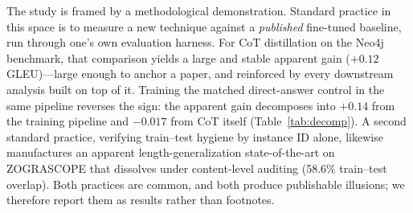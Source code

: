 \documentclass[11pt]{article}
\begin{document}
The study is framed by a methodological demonstration. Standard practice in this space is to
measure a new technique against a \emph{published} fine-tuned baseline, run through one's own
evaluation harness. For CoT distillation on the Neo4j benchmark, that comparison yields a large and
stable apparent gain ($+0.12$ GLEU)---large enough to anchor a paper, and reinforced by every
downstream analysis built on top of it. Training the matched direct-answer control in the same
pipeline reverses the sign: the apparent gain decomposes into $+0.14$ from the training pipeline
and $-0.017$ from CoT itself (Table~\ref{tab:decomp}). A second standard practice, verifying
train--test hygiene by instance ID alone, likewise manufactures an apparent length-generalization
state-of-the-art on ZOGRASCOPE \citep{zograscope2025} that dissolves under content-level auditing
(58.6\% train--test overlap). Both practices are common, and both produce publishable illusions;
we therefore report them as results rather than footnotes.
\end{document}
